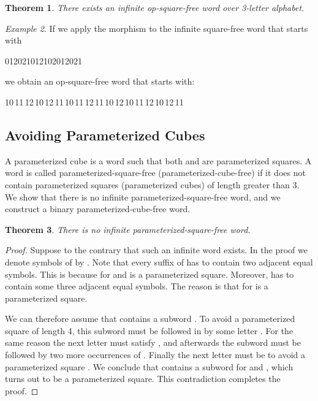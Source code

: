 \documentclass{article}
\theoremstyle{plain}
\newtheorem{theorem}{Theorem}[section]
\theoremstyle{definition}
\theoremstyle{remark}
\newtheorem{example}[theorem]{Example}
\begin{document}
  \begin{theorem}
    There exists an infinite op-square-free word over 3-letter alphabet.
  \end{theorem}

  \begin{example}
    If we apply the morphism  to the infinite square-free word that starts with
    \begin{center}
      012021012102012021\,
    \end{center}
    we obtain an op-square-free word that starts with:
    \begin{center}
      10\,11\,12\,10\,12\,11\,10\,11\,12\,11\,10\,12\,10\,11\,12\,10\,12\,11\,
    \end{center}
  \end{example}
  
  
\subsection{Avoiding Parameterized Cubes}
  A parameterized cube is a word  such that both  and  are parameterized squares.
  A word is called parameterized-square-free (parameterized-cube-free)
  if it does not contain parameterized squares (parameterized cubes) of length
  greater than 3.
  We show that there is no infinite parameterized-square-free word,
  and we construct a binary parameterized-cube-free word.

  \begin{theorem}
    There is no infinite parameterized-square-free word.
  \end{theorem}
  \begin{proof}
    Suppose to the contrary that such an infinite word  exists.
    In the proof we denote symbols of  by .
    Note that every suffix of  has to contain two adjacent equal symbols.
    This is because  for  and  is a parameterized square.
    Moreover,  has to contain some three adjacent equal symbols.
    The reason is that  for  is a parameterized square.

    We can therefore assume that  contains a subword .
    To avoid a parameterized square of length 4, this subword must be followed in 
    by some letter .
    For the same reason the next letter  must satisfy , and afterwards
    the subword  must be followed by two more occurrences of .
    Finally the next letter must be  to avoid a parameterized square .
    We conclude that  contains a subword  for  and ,
    which turns out to be a parameterized square.
    This contradiction completes the proof.
  \end{proof}
\end{document}
